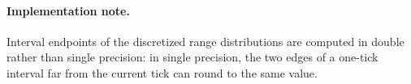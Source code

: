 \documentclass[11pt]{article}
\begin{document}
\paragraph{Implementation note.} Interval endpoints of the discretized range distributions are computed in double rather than single precision: in single precision, the two edges of a one-tick interval far from the current tick can round to the same value.



\end{document}
